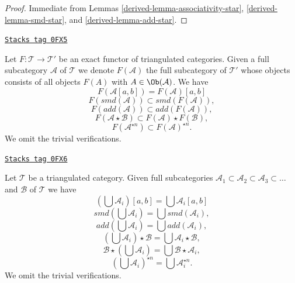 \begin{proof}

Immediate from Lemmas \ref{derived-lemma-associativity-star}, \ref{derived-lemma-smd-star}, and
\ref{derived-lemma-add-star}.
\end{proof}

\begin{remark}
\label{derived-remark-operations-functor}
\href{https://stacks.math.columbia.edu/tag/0FX5}{\texttt{Stacks tag 0FX5}}

Let $F : \mathcal{T} \to \mathcal{T}'$ be an exact functor of triangulated
categories. Given a full subcategory $\mathcal{A}$ of $\mathcal{T}$ we denote
$F(\mathcal{A})$ the full subcategory of $\mathcal{T}'$ whose objects
consists of all objects $F(A)$ with $A \in \Ob(\mathcal{A})$. We have
$$
F(\mathcal{A}[a, b]) = F(\mathcal{A})[a, b]
$$
$$
F(smd(\mathcal{A})) \subset smd(F(\mathcal{A})),
$$
$$
F(add(\mathcal{A})) \subset add(F(\mathcal{A})),
$$
$$
F(\mathcal{A} \star \mathcal{B}) \subset F(\mathcal{A}) \star F(\mathcal{B}),
$$
$$
F(\mathcal{A}^{\star n}) \subset F(\mathcal{A})^{\star n}.
$$
We omit the trivial verifications.
\end{remark}

\begin{remark}
\label{derived-remark-operations-unions}
\href{https://stacks.math.columbia.edu/tag/0FX6}{\texttt{Stacks tag 0FX6}}

Let $\mathcal{T}$ be a triangulated category. Given full subcategories
$\mathcal{A}_1 \subset \mathcal{A}_2 \subset \mathcal{A}_3 \subset \ldots$
and $\mathcal{B}$ of $\mathcal{T}$ we have
$$
\left(\bigcup \mathcal{A}_i\right)[a, b] = \bigcup \mathcal{A}_i[a, b]
$$
$$
smd\left(\bigcup \mathcal{A}_i\right) = \bigcup smd(\mathcal{A}_i),
$$
$$
add\left(\bigcup \mathcal{A}_i\right) = \bigcup add(\mathcal{A}_i),
$$
$$
\left(\bigcup \mathcal{A}_i\right) \star \mathcal{B} =
\bigcup \mathcal{A}_i \star \mathcal{B},
$$
$$
\mathcal{B} \star \left(\bigcup \mathcal{A}_i\right) =
\bigcup \mathcal{B} \star \mathcal{A}_i,
$$
$$
\left(\bigcup \mathcal{A}_i\right)^{\star n} =
\bigcup \mathcal{A}_i^{\star n}.
$$
We omit the trivial verifications.
\end{remark}

